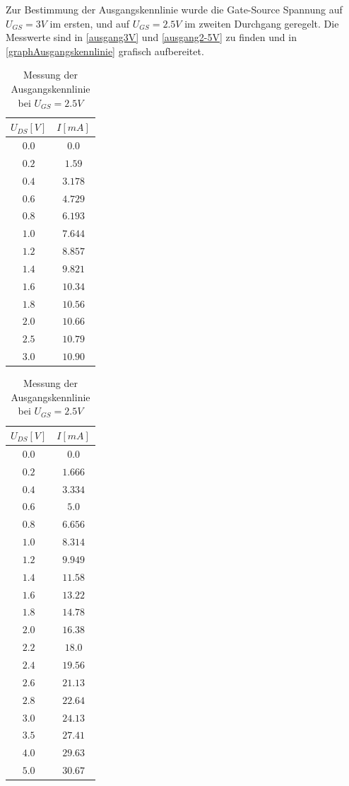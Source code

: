 \documentclass[11pt, a4paper]{article}
\begin{document}
Zur Bestimmung der Ausgangskennlinie wurde die Gate-Source Spannung auf $U_{GS} = 3 V$ im ersten, und auf $U_{GS} = 2.5 V$ im zweiten Durchgang geregelt. Die Messwerte sind in \autoref{ausgang3V} und \autoref{ausgang2-5V} zu finden und in \autoref{graphAusgangskennlinie} grafisch aufbereitet.
\begin{table}[htb]
    \centering
    \begin{minipage}[b][][b]{0.45\linewidth}
        \centering
		\begin{tabular}{c|c}
		$U_{DS} [V]$ & $I [mA]$ \\ \hline
		$0.0$ & $0.0$ \\
		$0.2$ & $1.59$ \\
		$0.4$ & $3.178$ \\
		$0.6$ & $4.729$ \\
		$0.8$ & $6.193$ \\
		$1.0$ & $7.644$ \\
		$1.2$ & $8.857$ \\
		$1.4$ & $9.821$ \\
		$1.6$ & $10.34$ \\
		$1.8$ & $10.56$ \\
		$2.0$ & $10.66$ \\
		$2.5$ & $10.79$ \\
		$3.0$ & $10.90$ 
		\end{tabular}
		\caption{Messung der Ausgangskennlinie bei $U_{GS} = 3 V$}
		\label{ausgang3V}
    \end{minipage}%
    \hfill
    \begin{minipage}[b]{0.45\linewidth}
        \centering
		\begin{tabular}{c|c}
		$U_{DS} [V]$ & $I [mA]$ \\ \hline
		$0.0$ & $0.0$ \\
		$0.2$ & $1.666$ \\
		$0.4$ & $3.334$ \\
		$0.6$ & $5.0$ \\
		$0.8$ & $6.656$ \\
		$1.0$ & $8.314$ \\
		$1.2$ & $9.949$ \\
		$1.4$ & $11.58$ \\
		$1.6$ & $13.22$ \\
		$1.8$ & $14.78$ \\
		$2.0$ & $16.38$ \\
		$2.2$ & $18.0$ \\
		$2.4$ & $19.56$ \\
		$2.6$ & $21.13$ \\
		$2.8$ & $22.64$ \\
		$3.0$ & $24.13$ \\
		$3.5$ & $27.41$ \\
		$4.0$ & $29.63$ \\
		$5.0$ & $30.67$
		\end{tabular}
		\caption{Messung der Ausgangskennlinie bei $U_{GS} = 2.5 V$}
		\label{ausgang2-5V}
    \end{minipage}
\end{table}
\end{document}
